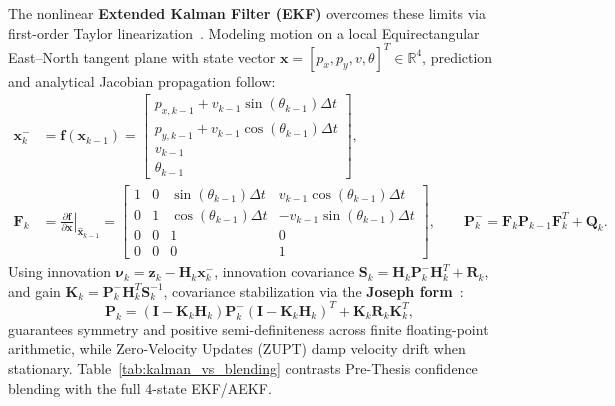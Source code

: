 The nonlinear \textbf{Extended Kalman Filter (EKF)} overcomes these limits via first-order Taylor linearization~\cite{gelb1974applied,groves2013principles}. Modeling motion on a local Equirectangular East--North tangent plane with state vector $\mathbf{x} = [p_x, p_y, v, \theta]^T \in \mathbb{R}^4$, prediction and analytical Jacobian propagation follow:
\begin{align}
    \mathbf{x}_k^- &= \mathbf{f}(\mathbf{x}_{k-1}) =
    \begin{bmatrix}
        p_{x,k-1} + v_{k-1}\sin(\theta_{k-1})\Delta t \\
        p_{y,k-1} + v_{k-1}\cos(\theta_{k-1})\Delta t \\
        v_{k-1} \\
        \theta_{k-1}
    \end{bmatrix}, \\
    \mathbf{F}_k &= \left.\frac{\partial \mathbf{f}}{\partial \mathbf{x}}\right|_{\hat{\mathbf{x}}_{k-1}} =
    \begin{bmatrix}
        1 & 0 & \sin(\theta_{k-1})\Delta t & v_{k-1}\cos(\theta_{k-1})\Delta t \\
        0 & 1 & \cos(\theta_{k-1})\Delta t & -v_{k-1}\sin(\theta_{k-1})\Delta t \\
        0 & 0 & 1 & 0 \\
        0 & 0 & 0 & 1
    \end{bmatrix}, \qquad
    \mathbf{P}_k^- = \mathbf{F}_k \mathbf{P}_{k-1} \mathbf{F}_k^T + \mathbf{Q}_k.
\end{align}
Using innovation $\boldsymbol{\nu}_k = \mathbf{z}_k - \mathbf{H}_k\mathbf{x}_k^-$, innovation covariance $\mathbf{S}_k = \mathbf{H}_k\mathbf{P}_k^-\mathbf{H}_k^T + \mathbf{R}_k$, and gain $\mathbf{K}_k = \mathbf{P}_k^-\mathbf{H}_k^T\mathbf{S}_k^{-1}$, covariance stabilization via the \textbf{Joseph form}~\cite{groves2013principles}:
\begin{equation}
    \mathbf{P}_k = (\mathbf{I} - \mathbf{K}_k\mathbf{H}_k)\mathbf{P}_k^-(\mathbf{I} - \mathbf{K}_k\mathbf{H}_k)^T + \mathbf{K}_k\mathbf{R}_k\mathbf{K}_k^T,
    \label{eq:joseph_form}
\end{equation}
guarantees symmetry and positive semi-definiteness across finite floating-point arithmetic, while Zero-Velocity Updates (ZUPT) damp velocity drift when stationary. Table~\ref{tab:kalman_vs_blending} contrasts Pre-Thesis confidence blending with the full 4-state EKF/AEKF.


